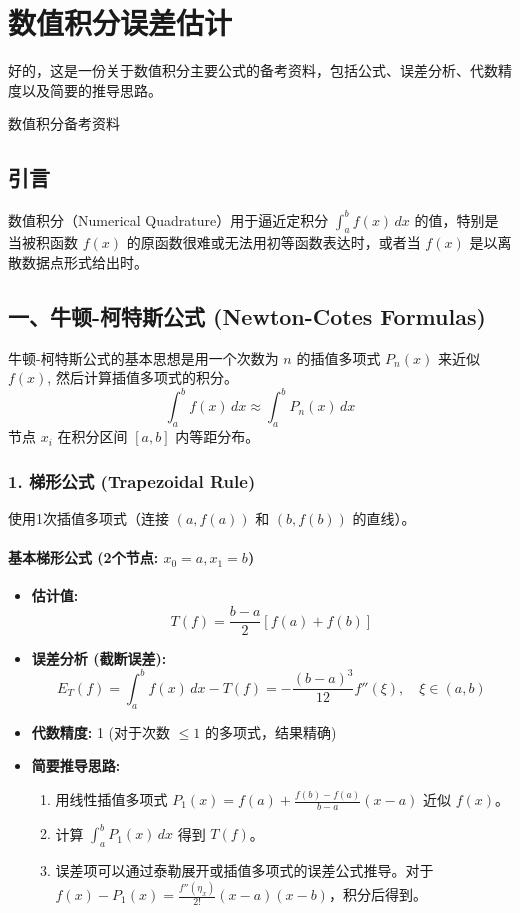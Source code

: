 \section{数值积分误差估计}

好的，这是一份关于数值积分主要公式的备考资料，包括公式、误差分析、代数精度以及简要的推导思路。

数值积分备考资料

\subsection{引言}

数值积分（Numerical Quadrature）用于逼近定积分 $\int_a^b f(x) \, dx$ 的值，特别是当被积函数 $f(x)$ 的原函数很难或无法用初等函数表达时，或者当 $f(x)$ 是以离散数据点形式给出时。

\subsection{一、牛顿-柯特斯公式 (Newton-Cotes Formulas)}

牛顿-柯特斯公式的基本思想是用一个次数为 $n$ 的插值多项式 $P_n(x)$ 来近似 $f(x)$, 然后计算插值多项式的积分。
\[
\int_a^b f(x) \, dx \approx \int_a^b P_n(x) \, dx
\]
节点 $x_i$ 在积分区间 $[a,b]$ 内等距分布。

\subsubsection{1. 梯形公式 (Trapezoidal Rule)}

使用1次插值多项式（连接 $(a, f(a))$ 和 $(b, f(b))$ 的直线）。

\paragraph{基本梯形公式 (2个节点: \texorpdfstring{$x_0=a, x_1=b$}{x_0=a, x_1=b})}

\begin{itemize}
	\item \textbf{估计值:}
\[
T(f) = \frac{b-a}{2} [f(a) + f(b)]
\]	\item \textbf{误差分析 (截断误差):}
\[
E_T(f) = \int_a^b f(x) \, dx - T(f) = -\frac{(b-a)^3}{12} f''(\xi), \quad \xi \in (a,b)
\]	\item \textbf{代数精度:} 1 (对于次数 $\le 1$ 的多项式，结果精确)
	\item \textbf{简要推导思路:}
	\begin{enumerate}
		\item 用线性插值多项式 $P_1(x) = f(a) + \frac{f(b)-f(a)}{b-a}(x-a)$ 近似 $f(x)$。
		\item 计算 $\int_a^b P_1(x) \, dx$ 得到 $T(f)$。
		\item 误差项可以通过泰勒展开或插值多项式的误差公式推导。对于 $f(x) - P_1(x) = \frac{f''(\eta_x)}{2!}(x-a)(x-b)$，积分后得到。
	\end{enumerate}
\end{itemize}

